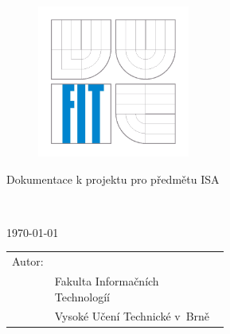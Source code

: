 \begin{titlepage}

\begin{figure}[!h]
  \centering
  \includegraphics[height=5cm]{logo.png}
\end{figure}

\vfill

\begin{center}
\begin{Large}
Dokumentace k projektu pro předmětu ISA\\
\end{Large}
\bigskip
\begin{Huge}
\projname\\
\end{Huge}
\end{center}

\vfill

\begin{center}
\begin{Large}
\today
\end{Large}
\end{center}

\vfill

\begin{flushleft}
\begin{large}
\begin{tabular}{ll}
Autor: & \author, \url{\email} \\
 & Fakulta Informačních Technologíí­ \\
 & Vysoké Učení­ Technické v~Brně \\
\end{tabular}
\end{large}
\end{flushleft}
\end{titlepage}
